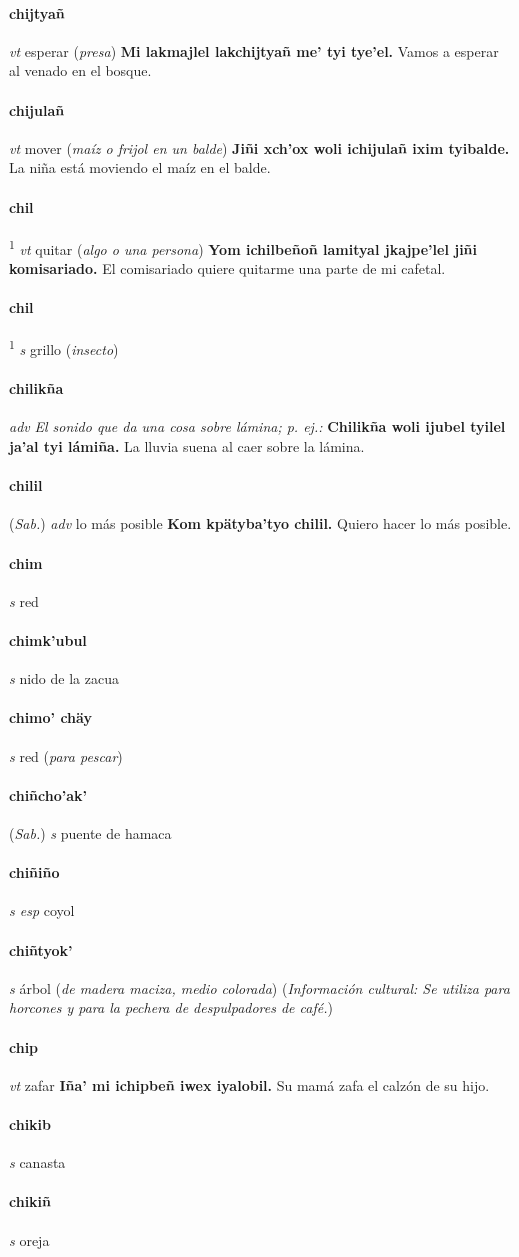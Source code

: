 \documentclass{scrbook}
\newcommand{\entry}[1]{\paragraph{#1}}
\newcommand{\defsuperscript}[1]{\textsuperscript{1}}
\newcommand{\nontranslationdef}[1]{\textit{#1}}
\newcommand{\partofspeech}[1]{\textit{#1}}
\newcommand{\spanishtranslation}[1]{#1}
\newcommand{\clarification}[1]{(\textit{#1})}
\newcommand{\cholexample}[1]{\textbf{#1}}
\newcommand{\exampletranslation}[1]{#1}
\newcommand{\relevantdialect}[1]{(\textit{#1})}
\newcommand{\culturalinformation}[1]{(\textit{#1})}
\begin{document}
\begin{multicols}{2}
\entry{chijtyañ}
\partofspeech{vt}
\spanishtranslation{esperar}
\clarification{presa}
\cholexample{Mi lakmajlel lakchijtyañ me' tyi tye'el.}
\exampletranslation{Vamos a esperar al venado en el bosque.}

\entry{chijulañ}
\partofspeech{vt}
\spanishtranslation{mover}
\clarification{maíz o frijol en un balde}
\cholexample{Jiñi xch'ox woli ichijulañ ixim tyibalde.}
\exampletranslation{La niña está moviendo el maíz en el balde.}

\entry{chil}
\defsuperscript{1}
\partofspeech{vt}
\spanishtranslation{quitar}
\clarification{algo o una persona}
\cholexample{Yom ichilbeñoñ lamityal jkajpe'lel jiñi komisariado.}
\exampletranslation{El comisariado quiere quitarme una parte de mi cafetal.}

\entry{chil}
\defsuperscript{2}
\partofspeech{s}
\spanishtranslation{grillo}
\clarification{insecto}

\entry{chilikña}
\partofspeech{adv}
\nontranslationdef{El sonido que da una cosa sobre lámina; p. ej.:}
\cholexample{Chilikña woli ijubel tyilel ja'al tyi lámiña.}
\exampletranslation{La lluvia suena al caer sobre la lámina.}

\entry{chilil}
\relevantdialect{Sab.}
\partofspeech{adv}
\spanishtranslation{lo más posible}
\cholexample{Kom kpätyba'tyo chilil.}
\exampletranslation{Quiero hacer lo más posible.}

\entry{chim}
\partofspeech{s}
\spanishtranslation{red}

\entry{chimk'ubul}
\partofspeech{s}
\spanishtranslation{nido de la zacua}

\entry{chimo' chäy}
\partofspeech{s}
\spanishtranslation{red}
\clarification{para pescar}

\entry{chiñcho'ak'}
\relevantdialect{Sab.}
\partofspeech{s}
\spanishtranslation{puente de hamaca}

\entry{chiñiño}
\partofspeech{s esp}
\spanishtranslation{coyol}

\entry{chiñtyok'}
\partofspeech{s}
\spanishtranslation{árbol}
\clarification{de madera maciza, medio colorada}
\culturalinformation{Información cultural: Se utiliza para horcones y para la pechera de despulpadores de café.}

\entry{chip}
\partofspeech{vt}
\spanishtranslation{zafar}
\cholexample{Iña' mi ichipbeñ iwex iyalobil.}
\exampletranslation{Su mamá zafa el calzón de su hijo.}

\entry{chikib}
\partofspeech{s}
\spanishtranslation{canasta}

\entry{chikiñ}
\partofspeech{s}
\spanishtranslation{oreja}


\end{multicols}
\end{document}
